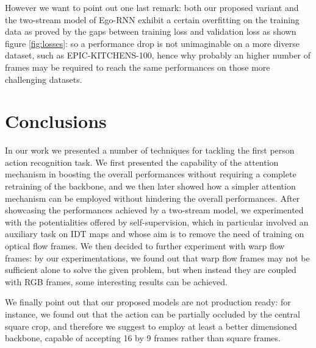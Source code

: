 \documentclass[10pt,twocolumn,letterpaper]{article}
\begin{document}
However we want to point out one last remark: both our proposed variant and the two-stream model of Ego-RNN exhibit a certain overfitting on the training data as proved by the gaps between training loss and validation loss as shown figure \ref{fig:losses}: so a performance drop is not unimaginable on a more diverse dataset, such as EPIC-KITCHENS-100, hence why probably an higher number of frames may be required to reach the same performances on those more challenging datasets.

\section{Conclusions}

In our work we presented a number of techniques for tackling the first person action recognition task. We first presented the capability of the attention mechanism in boosting the overall performances without requiring a complete retraining of the backbone, and we then later showed how a simpler attention mechanism can be employed without hindering the overall performances. After showcasing the performances achieved by a two-stream model, we experimented with the potentialities offered by self-supervision, which in particular involved an auxiliary task on IDT maps and whose aim is to remove the need of training on optical flow frames. We then decided to further experiment with warp flow frames: by our experimentations, we found out that warp flow frames may not be sufficient alone to solve the given problem, but when instead they are coupled with RGB frames, some interesting results can be achieved.

We finally point out that our proposed models are not production ready: for instance, we found out that the action can be partially occluded by the central square crop, and therefore we suggest to employ at least a better dimensioned backbone, capable of accepting 16 by 9 frames rather than square frames.

{\small


}
\end{document}
